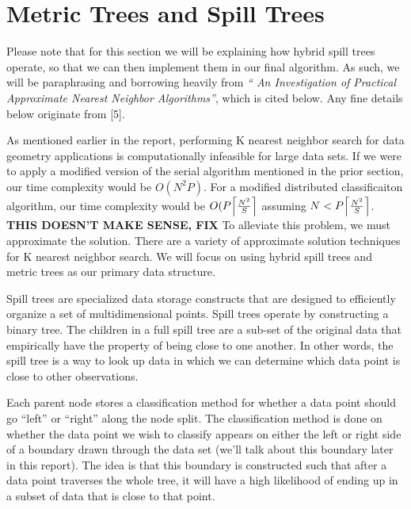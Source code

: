 \section{Metric Trees and Spill Trees}

\vspace{5 mm}
\noindent
Please note that for this section we will be explaining how hybrid spill 
trees operate, so that we can then implement them in our final algorithm. 
As such, we will be paraphrasing and borrowing heavily from  \textit{``
An Investigation of Practical Approximate Nearest Neighbor Algorithms''},
which is cited below.  Any fine details below originate from [5].

\vspace{5 mm}
\noindent
As mentioned earlier in the report, performing K nearest neighbor search for 
data geometry applications is computationally infeasible for large data sets. 
If we were to apply a modified version of the serial algorithm mentioned in the 
prior section, our time complexity would be $O(N^{2} P)$. For a modified 
distributed classificaiton algorithm, our time complexity would be 
$O(P \ceil*{\frac{N^{2}}{S}}$ assuming $N < P \ceil*{\frac{N^{2}}{S}}$. 
\textbf{THIS DOESN'T MAKE SENSE, FIX}
To alleviate this problem, we must approximate the solution. There are a 
variety of approximate solution techniques for K nearest neighbor search. We 
will focus on using hybrid spill trees and metric trees as our primary data 
structure.

\vspace{5 mm}
\noindent
Spill trees are specialized data storage constructs that are designed to 
efficiently organize a set of multidimensional points.  Spill trees operate by 
constructing a binary tree. The children in a full spill tree are a sub-set of 
the original data that empirically have the property of being close to one 
another. In other words, the spill tree is a way to look up data in which we 
can determine which data point is close to other observations.

\vspace{5 mm}
\noindent
Each parent node stores a classification method for whether a data point should 
go ``left'' or ``right'' along the node split. The classification method is 
done on whether the data point we wish to classify appears on either the left 
or right side of a boundary drawn through the data set (we'll talk about this 
boundary later in this report). The idea is that this boundary is constructed 
such that after a data point traverses the whole tree, it will have a high 
likelihood of ending up in a subset of data that is close to that point.

